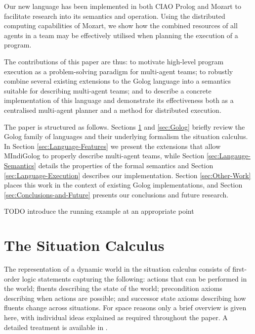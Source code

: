 \documentclass{llncs}
\begin{document}
Our new language has been implemented in both CIAO Prolog \cite{iclp99ciao}
and Mozart \cite{vanroy03mozart_logic} to facilitate research into
its semantics and operation. Using the distributed computing capabilities
of Mozart, we show how the combined resources of all agents in a team
may be effectively utilised when planning the execution of a program.

The contributions of this paper are thus: to motivate high-level program
execution as a problem-solving paradigm for multi-agent teams; to
robustly combine several existing extensions to the Golog language
into a semantics suitable for describing multi-agent teams; and to
describe a concrete implementation of this language and demonstrate
its effectiveness both as a centralised multi-agent planner and a
method for distributed execution.

The paper is structured as follows. Sections \ref{sec:Situation-Calculus}
and \ref{sec:Golog} briefly review the Golog family of languages
and their underlying formalism the situation calculus. In Section
\ref{sec:Language-Features} we present the extensions that allow
MIndiGolog to properly describe multi-agent teams, while Section \ref{sec:Langauge-Semantics}
details the properties of the formal semantics and Section \ref{sec:Language-Execution}
describes our implementation. Section \ref{sec:Other-Work} places
this work in the context of existing Golog implementations, and Section
\ref{sec:Conclusions-and-Future} presents our conclusions and future
research. 

TODO introduce the running example at an appropriate point


\section{The Situation Calculus}

\label{sec:Situation-Calculus}

The representation of a dynamic world in the situation calculus consists
of first-order logic statements capturing the following: actions that
can be performed in the world; fluents describing the state of the
world; precondition axioms describing when actions are possible; and
successor state axioms describing how fluents change across situations.
For space reasons only a brief overview is given here, with individual
ideas explained as required throughout the paper. A detailed treatment
is available in \cite{pirri99contributions_sitcalc}.
\end{document}
